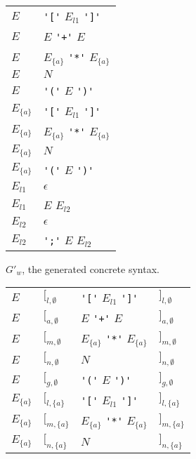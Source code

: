 \documentclass[acmsmall,review,anonymous]{acmart}\settopmatter{printfolios=true,printccs=false,printacmref=false}
\begin{document}
\begin{figure}
  \begin{subfigure}[t]{.45\linewidth}
    \centering
    \begin{tabular}{@{}l@{\quad$->$\quad}l@{}}
      \toprule
      $E$ & \verb|'['| $E_{l1}$ \verb|']'| \\
      $E$ & $E$ \verb|'+'| $E$ \\
      $E$ & $E_{\{a\}}$ \verb|'*'| $E_{\{a\}}$ \\
      $E$ & $N$ \\
      $E$ & \verb|'('| $E$ \verb|')'| \\
      \midrule
      $E_{\{a\}}$ & \verb|'['| $E_{l1}$ \verb|']'| \\
      $E_{\{a\}}$ & $E_{\{a\}}$ \verb|'*'| $E_{\{a\}}$ \\
      $E_{\{a\}}$ & $N$ \\
      $E_{\{a\}}$ & \verb|'('| $E$ \verb|')'| \\
      \midrule
      $E_{l1}$ & $\epsilon$ \\
      $E_{l1}$ & $E$ $E_{l2}$ \\
      \midrule
      $E_{l2}$ & $\epsilon$ \\
      $E_{l2}$ & \verb|';'| $E$ $E_{l2}$ \\
      \bottomrule
    \end{tabular}
    \caption{$G'_w$, the generated concrete syntax.}
    \label{fig:running-example-generated:w-prime}
  \end{subfigure}%
%
  \begin{subfigure}[t]{.54\linewidth}
    \centering
    \begin{tabular}{@{}l@{\quad$->$\quad}lll@{}}
      \toprule
      $E$ & $[_{l, \emptyset}$ & \verb|'['| $E_{l1}$ \verb|']'| & $]_{l, \emptyset}$ \\
      $E$ & $[_{a, \emptyset}$ & $E$ \verb|'+'| $E$ & $]_{a, \emptyset}$ \\
      $E$ & $[_{m, \emptyset}$ & $E_{\{a\}}$ \verb|'*'| $E_{\{a\}}$ & $]_{m, \emptyset}$ \\
      $E$ & $[_{n, \emptyset}$ & $N$ & $]_{n, \emptyset}$ \\
      $E$ & $[_{g, \emptyset}$ & \verb|'('| $E$ \verb|')'| & $]_{g, \emptyset}$ \\
      \midrule
      $E_{\{a\}}$ & $[_{l, \{a\}}$ & \verb|'['| $E_{l1}$ \verb|']'| & $]_{l, \{a\}}$ \\
      $E_{\{a\}}$ & $[_{m, \{a\}}$ & $E_{\{a\}}$ \verb|'*'| $E_{\{a\}}$ & $]_{m, \{a\}}$ \\
      $E_{\{a\}}$ & $[_{n, \{a\}}$ & $N$ & $]_{n, \{a\}}$ \\

\end{tabular}
\end{subfigure}
\end{figure}
\end{document}

